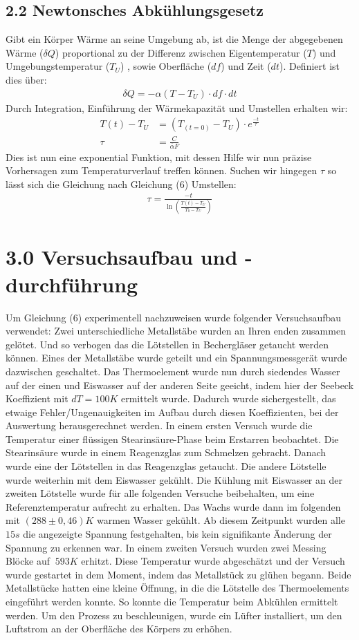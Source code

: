 \documentclass[a4paper]{article}
\begin{document}
\subsection*{2.2 Newtonsches Abkühlungsgesetz}
Gibt ein Körper Wärme an seine Umgebung ab, ist die Menge der abgegebenen Wärme ($\delta Q$) proportional zu der Differenz zwischen Eigentemperatur ($T$) und Umgebungstemperatur ($T_U$)	, sowie Oberfläche ($df$) und Zeit ($dt$). Definiert ist dies über: 
\begin{align}
\delta Q=-\alpha(T-T_U)\cdot df\cdot dt
\end{align}
Durch Integration, Einführung der Wärmekapazität und Umstellen erhalten wir: 
\begin{align}
T(t)-T_U&=(T_{(t=0)}-T_U)\cdot e^{\frac{-t}{\tau}}\\
\tau&=\frac{C}{\overline{\alpha}F}
\end{align}
Dies ist nun eine exponential Funktion, mit dessen Hilfe wir nun präzise Vorhersagen zum Temperaturverlauf treffen können. Suchen wir hingegen $\tau$ so lässt sich die Gleichung nach Gleichung (6) Umstellen:
\begin{align}
\tau=\frac{-t}{\ln\left(\frac{T(t)-T_U}{T_0-T_U}\right)}
\end{align}

\newpage
\section*{3.0 Versuchsaufbau und -durchführung}
Um Gleichung (6) experimentell nachzuweisen wurde folgender Versuchsaufbau verwendet: Zwei unterschiedliche Metallstäbe wurden an Ihren enden zusammen gelötet. Und so verbogen das die Lötstellen in Bechergläser getaucht werden können. Eines der Metallstäbe wurde geteilt und ein Spannungsmessgerät wurde dazwischen geschaltet. Das Thermoelement wurde nun durch siedendes Wasser auf der einen und Eiswasser auf der anderen Seite geeicht, indem hier der Seebeck Koeffizient mit $dT=100K$ ermittelt wurde. Dadurch wurde sichergestellt, das etwaige Fehler/Ungenauigkeiten im Aufbau durch diesen Koeffizienten, bei der Auswertung herausgerechnet werden. In einem ersten Versuch wurde die Temperatur einer flüssigen Stearinsäure-Phase beim Erstarren beobachtet. Die Stearinsäure wurde in einem Reagenzglas zum Schmelzen gebracht. Danach wurde eine der Lötstellen in das Reagenzglas getaucht. Die andere Lötstelle wurde weiterhin mit dem Eiswasser gekühlt. Die Kühlung mit Eiswasser an der zweiten Lötstelle wurde für alle folgenden Versuche beibehalten, um eine Referenztemperatur aufrecht zu erhalten. Das Wachs wurde dann im folgenden mit $(288\pm 0,46)K$ warmen Wasser gekühlt. Ab diesem Zeitpunkt wurden alle $15s$ die angezeigte Spannung festgehalten, bis kein signifikante Änderung der Spannung zu erkennen war. In einem zweiten Versuch wurden zwei Messing Blöcke auf $~593K$ erhitzt. Diese Temperatur wurde abgeschätzt und der Versuch wurde gestartet in dem Moment, indem das Metallstück zu glühen begann. Beide Metallstücke hatten eine kleine Öffnung, in die die Lötstelle des Thermoelements eingeführt werden konnte. So konnte die Temperatur beim Abkühlen ermittelt werden. Um den Prozess zu beschleunigen, wurde ein Lüfter installiert, um den Luftstrom an der Oberfläche des Körpers zu erhöhen.
\newpage
\end{document}
